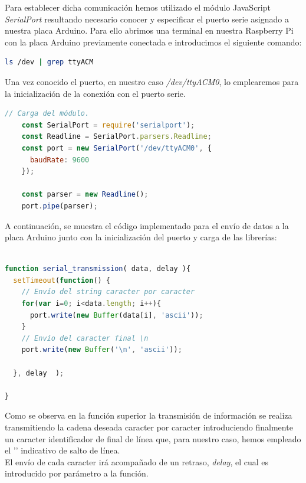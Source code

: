 Para establecer dicha comunicación hemos utilizado el módulo JavaScript \emph{SerialPort} resultando necesario conocer y especificar el puerto serie asignado a nuestra placa Arduino. 
Para ello abrimos una terminal en nuestra Raspberry Pi con la placa Arduino previamente conectada e introducimos el siguiente comando:\\

\begin{lstlisting}[language=bash]
ls /dev | grep ttyACM
\end{lstlisting}

Una vez conocido el puerto, en nuestro caso \emph{/dev/ttyACM0}, lo emplearemos para la inicialización de la conexión con el puerto serie.\\

\begin{lstlisting}[language=JavaScript]
    // Carga del módulo.
    const SerialPort = require('serialport');
    const Readline = SerialPort.parsers.Readline;
    const port = new SerialPort('/dev/ttyACM0', {
      baudRate: 9600
    });
    
    const parser = new Readline();
    port.pipe(parser);
\end{lstlisting}


A continuación, se muestra el código implementado para el envío de datos a la placa Arduino  junto con la inicialización del puerto y carga de las librerías:\\

\begin{lstlisting}[language=JavaScript]

function serial_transmission( data, delay ){
  setTimeout(function() {
    // Envío del string caracter por caracter
    for(var i=0; i<data.length; i++){
      port.write(new Buffer(data[i], 'ascii'));
    }
    // Envío del caracter final \n
    port.write(new Buffer('\n', 'ascii'));

  }, delay  );

}
\end{lstlisting}

Como se observa en la función superior la transmisión de información se realiza transmitiendo la cadena deseada caracter por caracter introduciendo finalmente un caracter identificador de final de línea que,
para nuestro caso, hemos empleado el '\n' indicativo de salto de línea.\\

El envío de cada caracter irá acompañado de un retraso, \emph{delay}, el cual es introducido por parámetro a la función.\\

